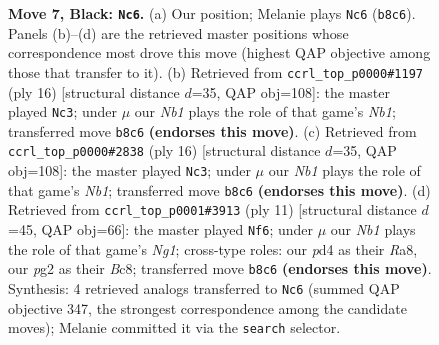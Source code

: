 \documentclass[11pt]{article}
\begin{document}
\begin{figure}[p]
\caption{\textbf{Move 7, Black: \texttt{Nc6}.} (a) Our position; Melanie plays \texttt{Nc6} (\texttt{b8c6}). Panels (b)--(d) are the retrieved master positions whose correspondence most drove this move (highest QAP objective among those that transfer to it). (b) Retrieved from \texttt{ccrl\_top\_p0000\#1197} (ply 16) [structural distance $d$=35, QAP obj=108]: the master played \texttt{Nc3}; under $\mu$ our \emph{Nb1} plays the role of that game's \emph{Nb1}; transferred move \texttt{b8c6} \textbf{(endorses this move)}. (c) Retrieved from \texttt{ccrl\_top\_p0000\#2838} (ply 16) [structural distance $d$=35, QAP obj=108]: the master played \texttt{Nc3}; under $\mu$ our \emph{Nb1} plays the role of that game's \emph{Nb1}; transferred move \texttt{b8c6} \textbf{(endorses this move)}. (d) Retrieved from \texttt{ccrl\_top\_p0001\#3913} (ply 11) [structural distance $d$=45, QAP obj=66]: the master played \texttt{Nf6}; under $\mu$ our \emph{Nb1} plays the role of that game's \emph{Ng1}; cross-type roles: our \emph{p}d4 as their \emph{R}a8, our \emph{p}g2 as their \emph{B}c8; transferred move \texttt{b8c6} \textbf{(endorses this move)}. Synthesis: 4 retrieved analogs transferred to \texttt{Nc6} (summed QAP objective 347, the strongest correspondence among the candidate moves); Melanie committed it via the \texttt{search} selector.}
\label{fig:thought-m13}
\end{figure}

\clearpage
\end{document}

